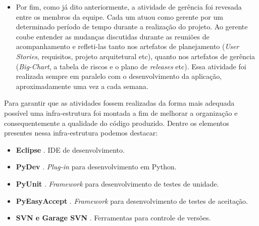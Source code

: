 \begin{itemize}
 \item Por fim, como já dito anteriormente, a atividade de gerência foi revesada entre os membros da equipe. Cada um atuou como gerente por um determinado período de tempo durante a realização do projeto. Ao gerente coube entender as mudanças discutidas durante as reuniões de acompanhamento e refleti-las tanto nos artefatos de planejamento (\textit{User Stories}, requisitos, projeto arquitetural etc), quanto nos artefatos de gerência (\textit{Big-Chart}, a tabela de riscos  e o plano de \textit{releases} etc). Essa atividade foi realizada sempre em paralelo com o desenvolvimento da aplicação, aproximadamente uma vez a cada semana.
 
\end{itemize}

Para garantir que as atividades fossem realizadas da forma mais adequada possível uma infra-estrutura foi montada a fim de melhorar a organização e consequentemente a qualidade do código produzido. Dentre os elementos presentes nessa infra-estrutura podemos destacar:

\begin{itemize}
 \item \textbf{Eclipse} \cite{eclipse}. IDE de desenvolvimento.
 \item \textbf{PyDev} \cite{pydev}. \textit{Plug-in} para desenvolvimento em Python.
 \item \textbf{PyUnit} \cite{pyunit}. \textit{Framework} para desenvolvimento de testes de unidade.
 \item \textbf{PyEasyAccept} \cite{pyeasyaccept}. \textit{Framework} para desenvolvimento de testes de aceitação.
 \item \textbf{SVN e Garage SVN} \cite{SVN}\cite{garage}. Ferramentas para controle de versões.
\end{itemize}
